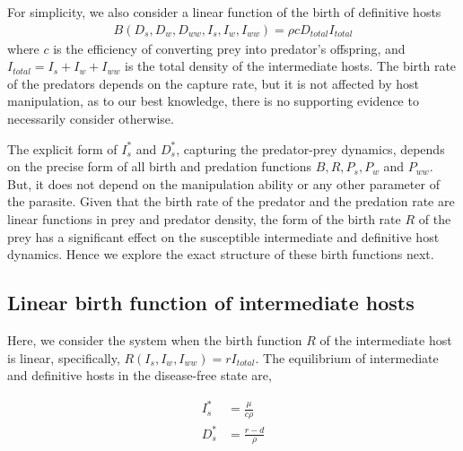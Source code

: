 \documentclass[11pt]{article}
\begin{document}
For simplicity, we also consider a linear function of the birth of definitive hosts
%
\begin{align*}
B(D_s, D_w, D_{ww}, I_s, I_w, I_{ww}) = \rho c D_{total} I_{total}
\end{align*}
%
where $c$ is the efficiency of converting prey into predator's offspring, and $I_{total} = I_s + I_w + I_{ww}$ is the total density of the intermediate hosts.
The birth rate of the predators depends on the capture rate, but it is not affected by host manipulation, as to our best knowledge, there is no supporting evidence to necessarily consider otherwise.

The explicit form of $I_s^*$ and $D_s^*$, capturing the predator-prey dynamics, depends on the precise form of all birth and predation functions $B, R, P_s, P_w$ and $P_{ww}$.
But, it does not depend on the manipulation ability or any other parameter of the parasite. 
Given that the birth rate of the predator and the predation rate are linear functions in prey and predator density, the form of the birth rate $R$ of the prey has a significant effect on the susceptible intermediate and definitive host dynamics.
Hence we explore the exact structure of these birth functions next.

\subsection*{Linear birth function of intermediate hosts}
Here, we consider the system when the birth function $R$ of the intermediate host is linear, specifically, $R(I_s, I_w, I_{ww}) = r I_{total}$. 
The equilibrium of intermediate and definitive hosts in the disease-free state are,

\begin{align*}
 I_s^* &= \frac{\mu}{c \rho} \\
 D_s^* &= \frac{r - d}{\rho}
\end{align*}
\end{document}
